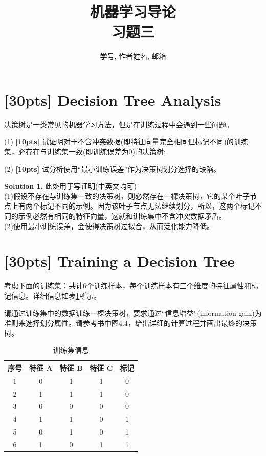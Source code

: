 \documentclass[a4paper,UTF8]{article}
\numberwithin{equation}{section}
\theoremstyle{definition}
\newtheorem*{solution}{Solution}
\begin{document}
\title{机器学习导论\\
习题三}
\author{学号, 作者姓名, 邮箱}
\maketitle
\section{[30pts] Decision Tree Analysis}
决策树是一类常见的机器学习方法，但是在训练过程中会遇到一些问题。

(1) \textbf{[10pts]} 试证明对于不含冲突数据(即特征向量完全相同但标记不同)的训练集，必存在与训练集一致(即训练误差为0)的决策树;

(2) \textbf{[10pts]} 试分析使用“最小训练误差”作为决策树划分选择的缺陷。
\begin{solution}
此处用于写证明(中英文均可)\\
(1)假设不存在与训练集一致的决策树，则必然存在一棵决策树，它的某个叶子节点上有两个标记不同的示例。因为该叶子节点无法继续划分，所以，这两个标记不同的示例必然有相同的特征向量，这就和训练集中不含冲突数据矛盾。\\
(2)使用最小训练误差，会使得决策树过拟合，从而泛化能力降低。
\end{solution}

\section{[30pts] Training a Decision Tree}
考虑下面的训练集：共计6个训练样本，每个训练样本有三个维度的特征属性和标记信息。详细信息如表\ref{table:training}所示。

请通过训练集中的数据训练一棵决策树，要求通过“信息增益”(information gain)为准则来选择划分属性。请参考书中图4.4，给出详细的计算过程并画出最终的决策树。
\begin{table}[h]
\centering
\caption{训练集信息}
\label{table:training}\vspace{2mm} 
\begin{tabular}{c|c c c|c}\hline
序号		&  特征 \textbf{A} 	&	特征 \textbf{B}	&	特征 \textbf{C} 	&	标记    \\ \hline
1		&  0 	&	1	&	1 	&	0    \\
2		&  1 	&	1 	&	1 	&	0    \\
3		&  0 	&	0 	&	0 	&	0    \\
4		&  1 	&	1 	&	0 	&	1    \\
5		&  0 	&	1 	&	0 	&	1    \\
6		&  1 	&	0 	&	1 	&	1    \\\hline
\end{tabular} 
\end{table}
\end{document}
